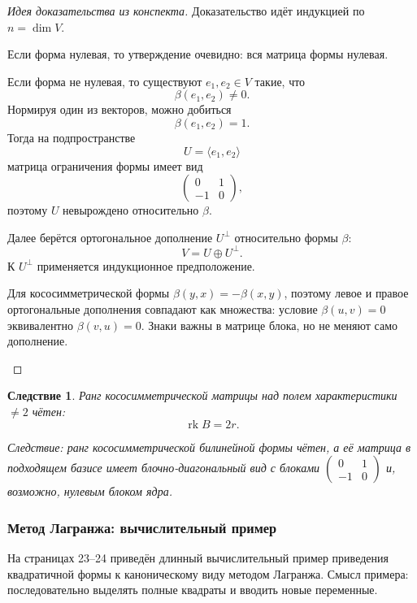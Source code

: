 \documentclass[12pt,a4paper]{article}
\theoremstyle{definition}
\theoremstyle{plain}
\newtheorem{corollary}[definition]{Следствие}
\theoremstyle{remark}
\newenvironment{knowledgefix}{\begin{clarifybox}}{\end{clarifybox}}
\newcommand{\rk}{\operatorname{rk}}
\begin{document}
\begin{proof}[Идея доказательства из конспекта]
Доказательство идёт индукцией по $n=\dim V$.

Если форма нулевая, то утверждение очевидно: вся матрица формы нулевая.

Если форма не нулевая, то существуют $e_1,e_2\in V$ такие, что
\[
    \beta(e_1,e_2)\ne0.
\]
Нормируя один из векторов, можно добиться
\[
    \beta(e_1,e_2)=1.
\]
Тогда на подпространстве
\[
    U=\langle e_1,e_2\rangle
\]
матрица ограничения формы имеет вид
\[
    \begin{pmatrix}
        0&1\\
        -1&0
    \end{pmatrix},
\]
поэтому $U$ невырождено относительно $\beta$.

Далее берётся ортогональное дополнение $U^\perp$ относительно формы $\beta$:
\[
    V=U\oplus U^\perp.
\]
К $U^\perp$ применяется индукционное предположение.
\begin{knowledgefix}
Для кососимметрической формы \(\beta(y,x)=-\beta(x,y)\), поэтому левое и правое ортогональные дополнения совпадают как множества: условие \(\beta(u,v)=0\) эквивалентно \(\beta(v,u)=0\). Знаки важны в матрице блока, но не меняют само дополнение.
\end{knowledgefix}
\end{proof}

\begin{corollary}
Ранг кососимметрической матрицы над полем характеристики $\ne2$ чётен:
\[
    \rk B=2r.
\]
\begin{knowledgefix}
Следствие: ранг кососимметрической билинейной формы чётен, а её матрица в подходящем базисе имеет блочно-диагональный вид с блоками \(\begin{pmatrix}0&1\\-1&0\end{pmatrix}\) и, возможно, нулевым блоком ядра.
\end{knowledgefix}
\end{corollary}

\subsubsection{Метод Лагранжа: вычислительный пример}


На страницах 23--24 приведён длинный вычислительный пример приведения квадратичной формы к каноническому виду методом Лагранжа.
Смысл примера: последовательно выделять полные квадраты и вводить новые переменные.
\end{document}
